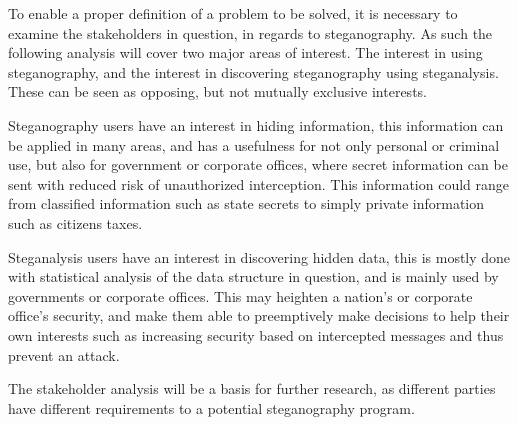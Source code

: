 To enable a proper definition of a problem to be solved, it is necessary to examine the stakeholders in question, in regards to steganography. As such the following analysis will cover two major areas of interest. The interest in using steganography, and the interest in discovering steganography using steganalysis. These can be seen as opposing, but not mutually exclusive interests.
 
Steganography users have an interest in hiding information, this information can be applied in many areas, and has a usefulness for not only personal or criminal use, but also for government or corporate offices, where secret information can be sent with reduced risk of unauthorized interception. This information could range from classified information such as state secrets to simply private information such as citizens taxes.

Steganalysis users have an interest in discovering hidden data, this is mostly done with statistical analysis of the data structure in question, and is mainly used by governments or corporate offices. This may heighten a nation's or corporate office's security, and make them able to preemptively make decisions to help their own interests such as increasing security based on intercepted messages and thus prevent an attack.

The stakeholder analysis will be a basis for further research, as different parties have different requirements to a potential steganography program.